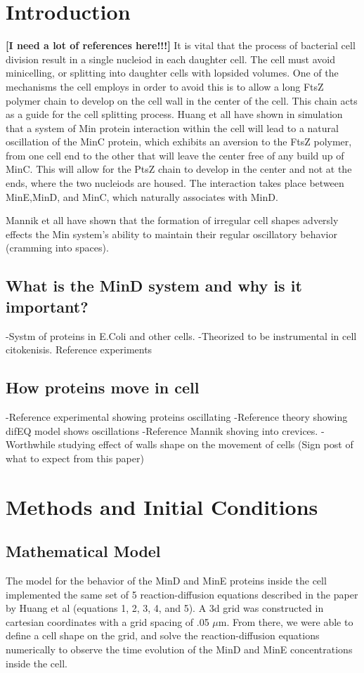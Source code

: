 \documentclass[letterpaper,twocolumn,amsmath,amssymb,pre]{revtex4-1}
\newcommand{\red}[1]{{\bf \color{red} #1}}
\newcommand{\fixme}[1]{\red{[#1]}}
\begin{document}
\section{Introduction}
\fixme{I need a lot of references here!!!}
It is vital that the process of bacterial cell division result in a single nucleiod in each daughter cell.  The cell must avoid minicelling, or splitting into daughter cells with lopsided volumes.  One of the mechanisms the cell employs in order to avoid this is to allow a long FtsZ polymer chain to develop on the cell wall in the center of the cell.  This chain acts as a guide for the cell splitting process.  Huang et all have shown in simulation that a system of Min protein interaction within the cell will lead to a natural oscillation of the MinC protein, which exhibits an aversion to the FtsZ polymer, from one cell end to the other that will leave the center free of any build up of MinC.  This will allow for the PtsZ chain to develop in the center and not at the ends, where the two nucleiods are housed.  The interaction takes place between MinE,MinD, and MinC, which naturally associates with MinD.

Mannik et all have shown that the formation of irregular cell shapes adversly effects the Min system's ability to maintain their regular oscillatory behavior (cramming into spaces).

\subsection{What is the MinD system and why is it important?}


-Systm of proteins in E.Coli and other cells.
-Theorized to be instrumental in cell citokenisis. Reference experiments
\subsection{How proteins move in cell}
-Reference experimental showing proteins oscillating
-Reference theory showing difEQ model shows oscillations
-Reference Mannik shoving into crevices.
-Worthwhile studying effect of walls shape on the movement of cells
(Sign post of what to expect from this paper)

\section{Methods and Initial Conditions}
\subsection{Mathematical Model} %
The model for the behavior of the MinD and MinE proteins inside the cell
implemented the same set of 5 reaction-diffusion equations described in the paper
by Huang et al (equations 1, 2, 3, 4, and 5). A 3d grid was constructed in
cartesian coordinates with a grid spacing of .05 $\mu$m. From there, we
were able to define a cell shape on the grid, and solve the
reaction-diffusion equations numerically to observe the time evolution of
the MinD and MinE concentrations inside the cell.
\end{document}
